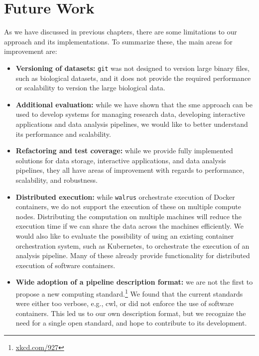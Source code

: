\section{Future Work}
As we have discussed in previous chapters, there are some limitations to our
approach and its implementations. To summarize these, the main areas for
improvement are: 

\begin{itemize} 

\item \textbf{Versioning of datasets:} \texttt{git} was not designed to version
large binary files, such as biological datasets, and it does not provide the
required performance or scalability to version the large biological data. 

\item \textbf{Additional evaluation:} while we have shown that the \gls{sme}
approach can be used to develop systems for managing research data, developing
interactive applications and data analysis pipelines, we would like to
better understand its performance and scalability. 

\item \textbf{Refactoring and test coverage:} while we provide fully implemented
solutions for data storage, interactive applications, and data analysis
pipelines, they all have areas of improvement with regards to performance,
scalability, and robustness. 

\item \textbf{Distributed execution:} while \texttt{walrus} orchestrate
execution of Docker containers, we do not support the execution of these on
multiple compute nodes. Distributing the computation on multiple machines will
reduce the execution time if we can share the data across the
machines efficiently. We would also like to evaluate the possibility of using an
existing container orchestration system, such as
Kubernetes, to orchestrate the execution of an analysis pipeline. Many of these
already provide functionality for distributed execution of software containers. 

\item \textbf{Wide adoption of a pipeline description format:} we are not the
first to propose a new computing standard.\footnote{\url{xkcd.com/927}} We found
that the current standards were either too verbose, e.g., \gls{cwl}, or did not
enforce the use of software containers. This led us to our own description
format, but we recognize the need for a single open standard, and hope to
contribute to its development. 

\end{itemize} 

